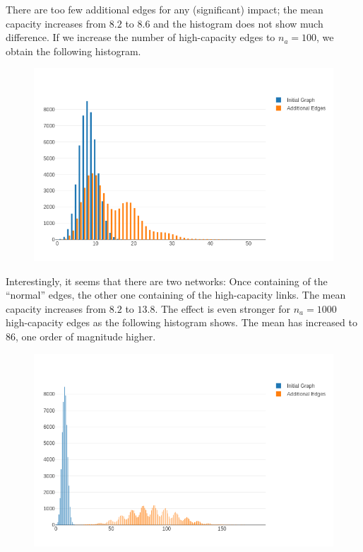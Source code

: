 There are too few additional edges for any (significant) impact; the mean capacity increases from $8.2$ to $8.6$ and the histogram does not show much difference. If we increase the number of high-capacity edges to $n_a=100$, we obtain the following histogram.

\begin{figure}[H]
\centering
\includegraphics[scale=0.55]{images/max_flow_05_02.png}
\end{figure}

Interestingly, it seems that there are two networks: Once containing of the ``normal'' edges, the other one containing of the high-capacity links. The mean capacity increases from $8.2$ to $13.8$. The effect is even stronger for $n_a = 1000$ high-capacity edges as the following histogram shows. The mean has increased to $86$, one order of magnitude higher.

\begin{figure}[H]
\centering
\includegraphics[scale=0.55]{images/max_flow_05_03.png}
\end{figure}

